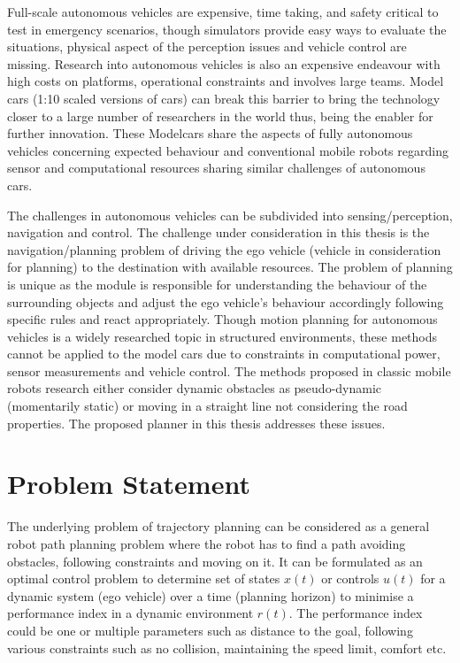 Full-scale autonomous vehicles are expensive, time taking, and safety critical to test in emergency scenarios, though simulators provide easy ways to evaluate the situations, physical aspect of the perception issues and vehicle control are missing. Research into autonomous vehicles is also an expensive endeavour with high costs on platforms, operational constraints and involves large teams. Model cars (1:10 scaled versions of cars) can break this barrier to bring the technology closer to a large number of researchers in the world thus, being the enabler for further innovation. These Modelcars share the aspects of fully autonomous vehicles concerning expected behaviour and conventional mobile robots regarding sensor and computational resources sharing similar challenges of autonomous cars. 

The challenges in autonomous vehicles can be subdivided into sensing/perception, navigation and control. The challenge under consideration in this thesis is the navigation/planning problem of driving the ego vehicle (vehicle in consideration for planning) to the destination with available resources. The problem of planning is unique as the module is responsible for understanding the behaviour of the surrounding objects and adjust the ego vehicle's behaviour accordingly following specific rules and react appropriately. Though motion planning for autonomous vehicles is a widely researched topic in structured environments, these methods cannot be applied to the model cars due to constraints in computational power, sensor measurements and vehicle control. The methods proposed in classic mobile robots research either consider dynamic obstacles as pseudo-dynamic (momentarily static) or moving in a straight line not considering the road properties. The proposed planner in this thesis addresses these issues. 

\section{Problem Statement}

The underlying problem of trajectory planning can be considered as a general robot path planning problem where the robot has to find a path avoiding obstacles, following constraints and moving on it. It can be formulated as an optimal control problem to determine set of states $x(t)$ or controls $u(t)$ for a dynamic system (ego vehicle) over a time (planning horizon) to minimise a performance index in a dynamic environment $r(t)$. The performance index could be one or multiple parameters such as distance to the goal, following various constraints such as no collision, maintaining the speed limit, comfort etc.



